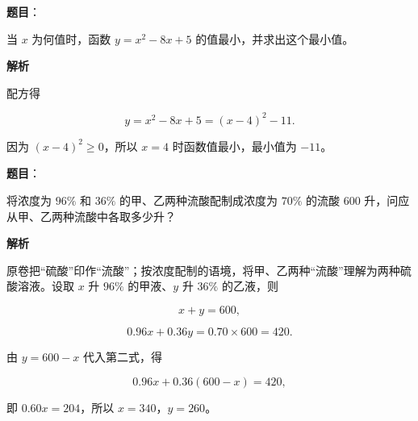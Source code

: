 \begin{answer}

\textbf{题目}：

当 $x$ 为何值时，函数 $y=x^2-8x+5$ 的值最小，并求出这个最小值。

\textbf{解析}

配方得

\nopagebreak[4]
\[
y=x^2-8x+5=(x-4)^2-11.
\]

因为 $(x-4)^2\geqslant0$，所以 $x=4$ 时函数值最小，最小值为 $-11$。


\end{answer}
\begin{answer}

\textbf{题目}：

将浓度为 $96\%$ 和 $36\%$ 的甲、乙两种流酸配制成浓度为 $70\%$ 的流酸 $600$ 升，问应从甲、乙两种流酸中各取多少升？

\textbf{解析}

原卷把“硫酸”印作“流酸”；按浓度配制的语境，将甲、乙两种“流酸”理解为两种硫酸溶液。设取 $x$ 升 $96\%$ 的甲液、$y$ 升 $36\%$ 的乙液，则

\nopagebreak[4]
\[
x+y=600,
\]

\nopagebreak[4]
\[
0.96x+0.36y=0.70\times600=420.
\]

由 $y=600-x$ 代入第二式，得

\nopagebreak[4]
\[
0.96x+0.36(600-x)=420,
\]

即 $0.60x=204$，所以 $x=340$，$y=260$。


\end{answer}